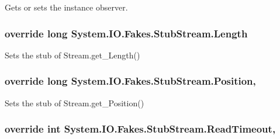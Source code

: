 Gets or sets the instance observer.

\hypertarget{class_system_1_1_i_o_1_1_fakes_1_1_stub_stream_ab994c18c810be9fd59b11604294fbfa8}{
\subsubsection[{Length}]{\setlength{\rightskip}{0pt plus 5cm}override long System.\-I\-O.\-Fakes.\-Stub\-Stream.\-Length\hspace{0.3cm}{\ttfamily [get]}}}\label{class_system_1_1_i_o_1_1_fakes_1_1_stub_stream_ab994c18c810be9fd59b11604294fbfa8}


Sets the stub of Stream.\-get\-\_\-\-Length()

\hypertarget{class_system_1_1_i_o_1_1_fakes_1_1_stub_stream_a5b68fff2e0b26047d9e8e87a424a6da7}{
\subsubsection[{Position}]{\setlength{\rightskip}{0pt plus 5cm}override long System.\-I\-O.\-Fakes.\-Stub\-Stream.\-Position\hspace{0.3cm}{\ttfamily [get]}, {\ttfamily [set]}}}\label{class_system_1_1_i_o_1_1_fakes_1_1_stub_stream_a5b68fff2e0b26047d9e8e87a424a6da7}


Sets the stub of Stream.\-get\-\_\-\-Position()

\hypertarget{class_system_1_1_i_o_1_1_fakes_1_1_stub_stream_ac2ad0a8f43f9e86ae213834d5a7c5a16}{
\subsubsection[{Read\-Timeout}]{\setlength{\rightskip}{0pt plus 5cm}override int System.\-I\-O.\-Fakes.\-Stub\-Stream.\-Read\-Timeout\hspace{0.3cm}{\ttfamily [get]}, {\ttfamily [set]}}}\label{class_system_1_1_i_o_1_1_fakes_1_1_stub_stream_ac2ad0a8f43f9e86ae213834d5a7c5a16}


